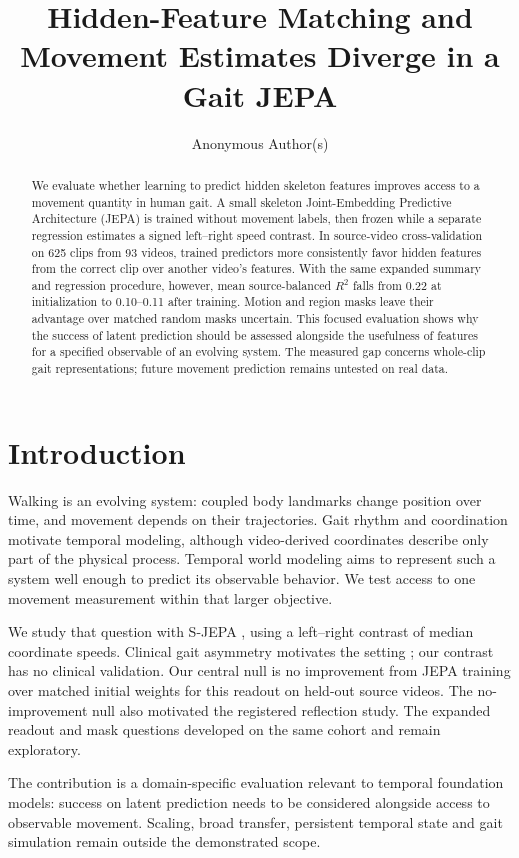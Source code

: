 \documentclass{article}
\title{Hidden-Feature Matching and Movement Estimates Diverge in a Gait JEPA}
\author{Anonymous Author(s)}
\begin{document}
\maketitle
\begin{abstract}
We evaluate whether learning to predict hidden skeleton features
improves access to a movement quantity in human gait. A small skeleton
Joint-Embedding Predictive Architecture (JEPA) is trained without
movement labels, then frozen while a separate regression estimates a
signed left--right speed contrast. In source-video cross-validation on
625 clips from 93 videos, trained predictors more consistently favor
hidden features from the correct clip over another video's features.
With the same expanded summary and regression procedure, however, mean
source-balanced \(R^2\) falls from 0.22 at initialization to 0.10--0.11
after training. Motion and region masks leave their advantage over
matched random masks uncertain. This focused evaluation shows why the
success of latent prediction should be assessed alongside the usefulness
of features for a specified observable of an evolving system. The
measured gap concerns whole-clip gait representations; future movement
prediction remains untested on real data.
\end{abstract}
\section{Introduction}\label{introduction}

Walking is an evolving system: coupled body landmarks change position
over time, and movement depends on their trajectories. Gait rhythm and
coordination motivate temporal modeling, although video-derived
coordinates describe only part of the physical process. Temporal world
modeling aims to represent such a system well enough to predict its
observable behavior. We test access to one movement measurement within
that larger objective.

We study that question with S-JEPA \citep{sjepa}, using a left--right
contrast of median coordinate speeds. Clinical gait asymmetry motivates
the setting \citep{stroke}; our contrast has no clinical validation. Our
central null is no improvement from JEPA training over matched initial
weights for this readout on held-out source videos. The no-improvement
null also motivated the registered reflection study. The expanded
readout and mask questions developed on the same cohort and remain
exploratory.

The contribution is a domain-specific evaluation relevant to temporal
foundation models: success on latent prediction needs to be considered
alongside access to observable movement. Scaling, broad transfer,
persistent temporal state and gait simulation remain outside the
demonstrated scope.
\end{document}

